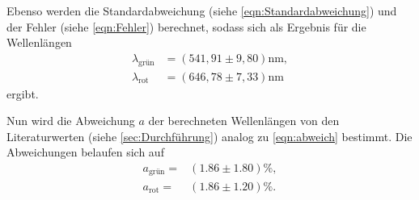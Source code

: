 Ebenso werden die Standardabweichung (siehe \autoref{eqn:Standardabweichung}) und der Fehler (siehe \autoref{eqn:Fehler}) berechnet,
sodass sich als Ergebnis für die Wellenlängen
\begin{align*}
  \lambda_{\text{grün}} &= (541,91 \pm 9,80) \si{\nano\meter},\\
  \lambda_{\text{rot}} &= (646,78 \pm 7,33) \si{\nano\meter}
\end{align*}
ergibt.

Nun wird die Abweichung $a$ 
der berechneten Wellenlängen von den Literaturwerten (siehe \autoref{sec:Durchführung}) analog zu \autoref{eqn:abweich} bestimmt.
Die Abweichungen belaufen sich auf
\begin{align*}
  a_{\text{grün}}=& (1.86\pm 1.80) \si{\percent},\\
  a_{\text{rot}}=& (1.86 \pm 1.20) \si{\percent}.
\end{align*}